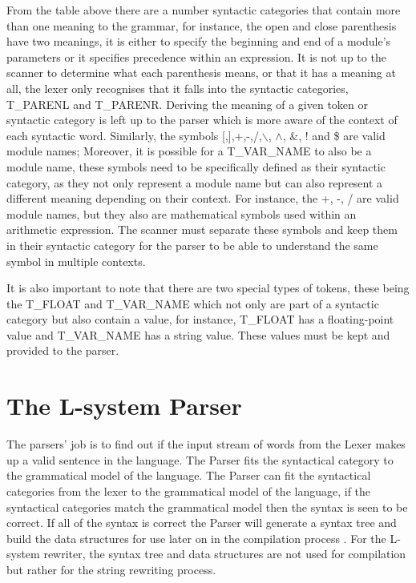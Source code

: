 \noindent
From the table above there are a number syntactic categories that contain more than one meaning to the grammar, for instance, the open and close parenthesis have two meanings, it is either to specify the beginning and end of a module's parameters or it specifies precedence within an expression.  It is not up to the scanner to determine what each parenthesis means, or that it has a meaning at all, the lexer only recognises that it falls into the syntactic categories, T\_PARENL and T\_PARENR. Deriving the meaning of a given token or syntactic category is left up to the parser which is more aware of the context of each syntactic word. Similarly, the symbols [,],+,-,/,$\backslash$, $\land$, $\&$, ! and \$ are valid module names; Moreover, it is possible for a T\_VAR\_NAME to also be a module name, these symbols need to be specifically defined as their syntactic category, as they not only represent a module name but can also represent a different meaning depending on their context. For instance, the +, -, / are valid module names, but they also are mathematical symbols used within an arithmetic expression. The scanner must separate these symbols and keep them in their syntactic category for the parser to be able to understand the same symbol in multiple contexts. 

It is also important to note that there are two special types of tokens, these being the T\_FLOAT and T\_VAR\_NAME which not only are part of a syntactic category but also contain a value, for instance, T\_FLOAT has a floating-point value and T\_VAR\_NAME has a string value. These values must be kept and provided to the parser.

\section{The L-system Parser} \label{parser}

The parsers' job is to find out if the input stream of words from the \gls{Lexer} makes up a valid sentence in the language. The \gls{Parser} fits the syntactical category to the grammatical model of the language. The \gls{Parser} can fit the syntactical categories from the lexer to the grammatical model of the language, if the syntactical categories match the grammatical model then the syntax is seen to be correct. If all of the syntax is correct the \gls{Parser} will generate a syntax tree and build the data structures for use later on in the compilation process \cite{cooper2011engineering}. For the L-system rewriter, the syntax tree and data structures are not used for compilation but rather for the string rewriting process. 

